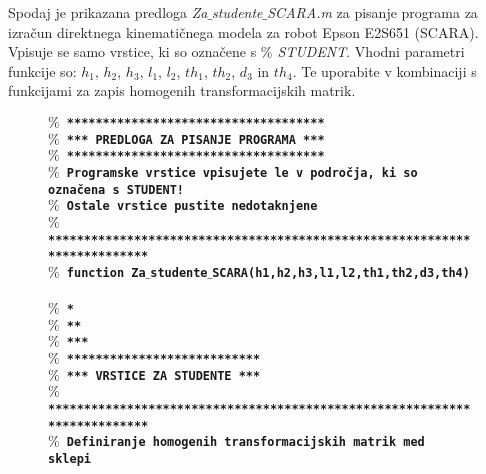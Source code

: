 
\vspace{0.2cm}%
Spodaj je prikazana predloga \emph{Za$\_$studente$\_$SCARA.m} za
pisanje programa za izračun direktnega kinematičnega modela za robot
Epson E2S651 (SCARA). Vpisuje se samo vrstice, ki so označene s
\emph{$\%$ STUDENT}. Vhodni parametri funkcije so: $h_1$, $h_2$,
$h_3$, $l_1$, $l_2$, $th_1$, $th_2$, $d_3$ in $th_4$. Te uporabite v
kombinaciji s funkcijami za zapis homogenih transformacijskih
matrik.


\begin{figure}[h]
\scriptsize%
\textcolor[rgb]{0.13,0.55,0.13}{\textbf{\texttt{$\%$ ************************************}}}\\ %
\textcolor[rgb]{0.13,0.55,0.13}{\textbf{\texttt{$\%$ *** PREDLOGA ZA PISANJE PROGRAMA ***}}}\\ %
\textcolor[rgb]{0.13,0.55,0.13}{\textbf{\texttt{$\%$ ************************************}}}\\ %
\textcolor[rgb]{0.13,0.55,0.13}{\textbf{\texttt{$\%$ Programske vrstice vpisujete le v področja, ki so označena s STUDENT!}}}\\ %
\textcolor[rgb]{0.13,0.55,0.13}{\textbf{\texttt{$\%$ Ostale vrstice pustite nedotaknjene}}}\\ %
\textcolor[rgb]{0.13,0.55,0.13}{\textbf{\texttt{$\%$ *************************************************************************}}}\\ %
\textcolor[rgb]{0.00,0.00,0.00}{\textbf{\texttt{$\%$ function Za$\_$studente$\_$SCARA(h1,h2,h3,l1,l2,th1,th2,d3,th4)}}}\\ %
\\ %
\textcolor[rgb]{0.13,0.55,0.13}{\textbf{\texttt{$\%$ *}}}\\ %
\textcolor[rgb]{0.13,0.55,0.13}{\textbf{\texttt{$\%$ **}}}\\ %
\textcolor[rgb]{0.13,0.55,0.13}{\textbf{\texttt{$\%$ ***}}}\\ %
\textcolor[rgb]{0.13,0.55,0.13}{\textbf{\texttt{$\%$ ***************************}}}\\ %
\textcolor[rgb]{0.13,0.55,0.13}{\textbf{\texttt{$\%$ *** VRSTICE ZA STUDENTE ***}}}\\ %
\textcolor[rgb]{0.13,0.55,0.13}{\textbf{\texttt{$\%$ *************************************************************************}}}\\ %
\textcolor[rgb]{0.13,0.55,0.13}{\textbf{\texttt{$\%$ Definiranje homogenih transformacijskih matrik med sklepi}}}\\ %

\end{figure}
